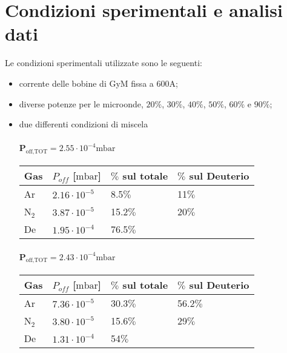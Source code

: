 \section{Condizioni sperimentali e analisi dati}
Le condizioni sperimentali utilizzate sono le seguenti:
\begin{itemize}
 \item corrente delle bobine di GyM fissa a $600\si{\ampere}$;
 \item diverse potenze per le microonde, $20\%$, $30\%$, $40\%$, $50\%$, $60\%$ e $90\%$;
 \item due differenti condizioni di miscela
 

    \begin{center}
    \paragraph{P$_\text{off,TOT}=2.55\cdot10^{-4}\si{\milli\bar}$} 
    \begin{tabular}{p{3cm}p{3cm}p{3cm}p{3cm}}
    \toprule
    Gas		&$P_{off}$ [$\si{\milli\bar}$] &$\%$ sul totale &$\%$ sul Deuterio\\
    \midrule
    Ar		&$2.16\cdot10^{-5}$	&8.5$\%$	&11$\%$\\
    N$_2$	&$3.87\cdot10^{-5}$	&15.2$\%$	&20$\%$\\
    De		&$1.95\cdot10^{-4}$	&76.5$\%$	&\\
    \bottomrule
    \end{tabular}
    \end{center}
    
    \begin{center}
    \paragraph{P$_\text{off,TOT}=2.43\cdot10^{-4}\si{\milli\bar}$}
    \begin{tabular}{p{3cm}p{3cm}p{3cm}p{3cm}}
    \toprule
    Gas		&$P_{off}$ [$\si{\milli\bar}$] &$\%$ sul totale &$\%$ sul Deuterio\\
    \midrule
    Ar		&$7.36\cdot10^{-5}$	&30.3$\%$	&56.2$\%$\\
    N$_2$	&$3.80\cdot10^{-5}$	&15.6$\%$	&29$\%$\\
    De		&$1.31\cdot10^{-4}$	&54$\%$		&\\
    \bottomrule
    \end{tabular}
    \end{center}

\end{itemize}


